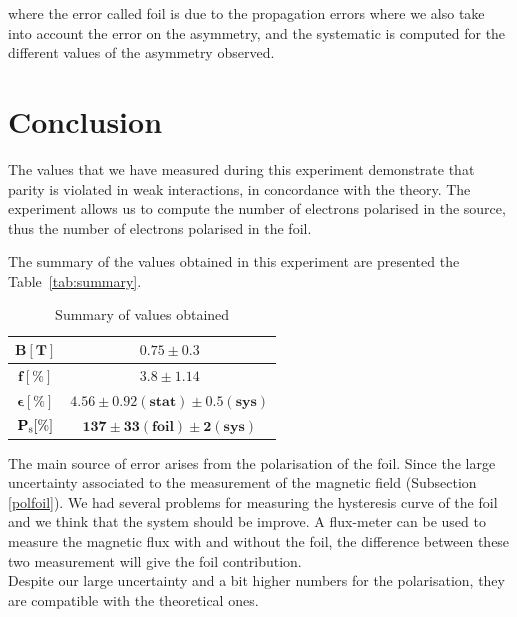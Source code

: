 \documentclass[10pt,swedish, openany]{book}
\begin{document}
where the error called foil is due to the propagation errors where we also take into account the error on the asymmetry, and the systematic is computed for the different values of the asymmetry observed.


\chapter{Conclusion}

The values that we have measured during this experiment demonstrate that parity is violated in weak interactions, in concordance with the theory. The experiment allows us to compute the number of electrons polarised in the source, thus the number of electrons polarised in the foil.

The summary of the values obtained in this experiment are presented the Table~\ref{tab:summary}.

\begin{table}[H]
    \centering
    \begin{tabular}{|c |c|}
    \hline
         $\mathbf{B [T]}$ & $\mathbf{0.75 \pm 0.3}$ \\
         \hline
         $\mathbf{f [\%]}$ & $\mathbf{3.8 \pm 1.14}$\\
         \hline
         $\mathbf{\epsilon [\%]}$ & $\mathbf{4.56 \pm 0.92 (stat) \pm 0.5 (sys)}$\\
         \hline
        $\mathbf{P_{\rm s} [\%]}$ & $\mathbf{137 \pm 33(foil) \pm 2(sys)}$\\ 
        \hline
    \end{tabular}
    \label{tab:summaryl}
    \caption{Summary of values obtained}
\end{table}

The main source of error arises from the polarisation of the foil. Since the large uncertainty associated to the measurement of the magnetic field (Subsection \ref{polfoil}). We had several problems for measuring the hysteresis curve of the foil and we think that the system should be improve. A flux-meter can be used to measure the magnetic flux with and without the foil, the difference between these two measurement will give the foil contribution.\\

Despite our large uncertainty and a bit higher numbers for the polarisation, they are compatible with the theoretical ones.

\pagebreak
\end{document}
